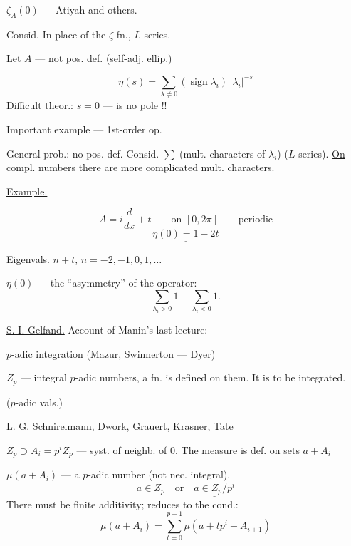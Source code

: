 $\zeta_A(0)$ — Atiyah and others.

Consid. In place of the $\zeta$-fn., $L$-series.


\begin{flushright}\small \uline{Let \mbox{$A$} — not pos. def.} (self-adj. ellip.)\end{flushright}
\[
\eta(s)=\sum_{\lambda\ne0}(\operatorname{sign}\lambda_i)\,|\lambda_i|^{-s}
\]
Difficult theor.: \uline{\mbox{$s=0$} — is no pole} !!

Important example — 1st-order op.

General prob.: no pos. def. Consid.
$\sum$ (mult. characters of $\lambda_i$)
($L$-series).
\uline{On compl. numbers} \uline{there are more complicated mult. characters.}

\uline{Example.}

\[
 A=i\frac{d}{dx}+t\qquad\text{on }[0,2\pi]\qquad\text{periodic}
\]
\[
\underline{\eta(0)=1-2t}
\]


Eigenvals. $n+t$, $n=-2,-1,0,1,\ldots$

$\eta(0)$ — the “asymmetry” of the operator:
\[
\sum_{\lambda_i>0}1-\sum_{\lambda_i<0}1.
\]

\uline{S. I. Gelfand.} Account of Manin’s last lecture:

$p$-adic integration (Mazur, Swinnerton — Dyer)




$Z_p$ — integral $p$-adic numbers, a fn. is defined on them. It is to be integrated.

($p$-adic vals.)

 L. G. Schnirelmann, Dwork, Grauert, Krasner, Tate

$Z_p\supset A_i=p^iZ_p$ — syst. of neighb. of $0$.
The measure is def. on sets $a+A_i$

$\mu(a+A_i)$ — a $p$-adic number (not nec. integral).
\[
a\in Z_p\quad\text{or}\quad \underline{a\in Z_p/p^i}
\]
There must be finite additivity; reduces to the cond.:
\[
\mu(a+A_i)=\sum_{t=0}^{p-1}\mu(a+tp^i+A_{i+1})
\]


